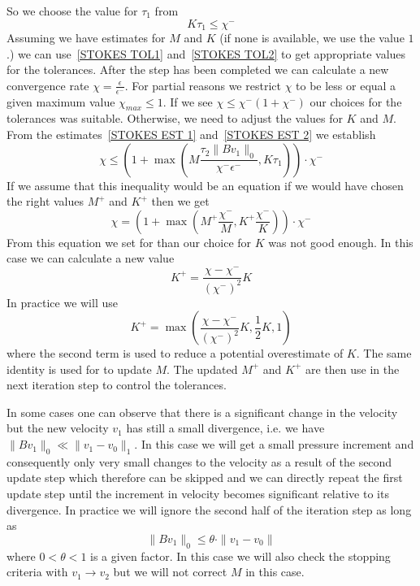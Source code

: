 So we choose the value for $\tau_{1}$ from
\begin{equation} \label{STOKES TOL1}
K \tau_{1} \le \chi^{-}
\end{equation}
Assuming we have estimates for $M$ and $K$ (if none is available, we use the value $1$.)
we can use~\ref{STOKES TOL1} and~\ref{STOKES TOL2} to get appropriate values for the tolerances. After
the step has been completed we can calculate a new convergence rate $\chi =\frac{\epsilon}{\epsilon^{-}}$. 
For partial reasons we restrict $\chi$ to be less or equal a given maximum value $\chi_{max}\le 1$.
If we see $\chi \le \chi^{-} (1+\chi^{-})$ our choices for the tolerances was suitable. Otherwise, we need to adjust the values for $K$ and $M$. From the estimates~\ref{STOKES EST 1} and~\ref{STOKES EST 2} we establish
\begin{equation}\label{STOKES EST 3}
\chi \le ( 1 + \max(M \frac{\tau_{2} \|B v_{1}\|_{0}}{\chi^{-} \epsilon^{-}},K \tau_{1}  ) ) \cdot \chi^{-} 
\end{equation}
If we assume that this inequality would be an equation if we would have chosen the right values
$M^{+}$ and $K^{+}$ then we get 
\begin{equation}\label{STOKES EST 3b}
\chi =  ( 1 + \max(M^{+} \frac{\chi^{-}}{M},K^{+} \frac{\chi^{-}}{K}) ) \cdot \chi^{-} 
\end{equation}
From this equation we set for 
than our choice for $K$ was not good enough. In this case we can calculate a new value
 \begin{equation}
K^{+} =  \frac{\chi-\chi^{-}}{(\chi^{-})^2} K
\end{equation}
In practice we will use 
 \begin{equation}
K^{+}  = \max(\frac{\chi-\chi^{-}}{(\chi^{-})^2} K,\frac{1}{2}K,1)
\end{equation}
where the second term is used to reduce a potential overestimate of $K$.  
The same identity is used for to update $M$. The updated $M^{+}$ and $K^{+}$ 
are then use in the next iteration step to control the tolerances. 

In some cases one can observe that there is a significant change 
in the velocity but the new velocity $v_{1}$ has still a 
small divergence, i.e. we have
$\|Bv_{1}\|_{0} \ll \|v_{1}-v_{0}\|_{1}$. 
In this case we will get a small pressure increment and consequently only very small changes to
the velocity as a result of the second update step which therefore can be skipped and
we can directly repeat the first update step until the increment in velocity becomes
significant relative to its divergence. In practice we will ignore the second half of the iteration step
as long as 
 \begin{equation}\label{STOKES LARGE BV1}
\|Bv_{1}\|_{0} \le \theta \cdot \|v_{1}-v_{0}\| 
\end{equation}
where $0<\theta<1$ is a given factor. In this case we will also check the stopping criteria 
with $v_{1}\rightarrow v_{2}$ but we will not correct $M$ in this case.

